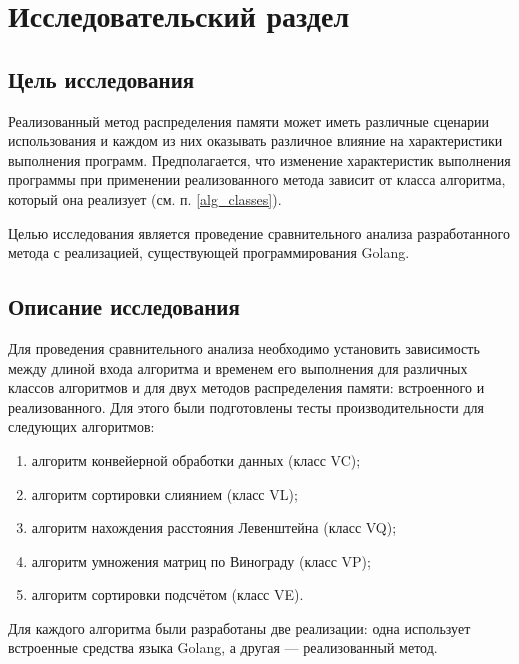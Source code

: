 \chapter{Исследовательский раздел}


\section*{Цель исследования}

Реализованный метод распределения памяти может иметь различные сценарии использования и каждом из них оказывать различное влияние на характеристики выполнения программ. Предполагается, что изменение характеристик выполнения программы при применении реализованного метода зависит от класса алгоритма, который она реализует (см. п. \ref{alg_classes}).

Целью исследования является проведение сравнительного анализа разработанного метода с реализацией, существующей программирования Golang.

\section*{Описание исследования}

Для проведения сравнительного анализа необходимо установить зависимость между длиной входа алгоритма и временем его выполнения для различных классов алгоритмов и для двух методов распределения памяти: встроенного и реализованного. Для этого были подготовлены тесты производительности для следующих алгоритмов:

\begin{enumerate}[label*=\arabic*)]
	\item алгоритм конвейерной обработки данных (класс VC);
	\item алгоритм сортировки слиянием (класс VL);
	\item алгоритм нахождения расстояния Левенштейна (класс VQ);
	\item алгоритм умножения матриц по Винограду (класс VP);
	\item алгоритм сортировки подсчётом (класс VE).
\end{enumerate}

Для каждого алгоритма были разработаны две реализации: одна использует встроенные средства языка Golang, а другая --- реализованный метод.



